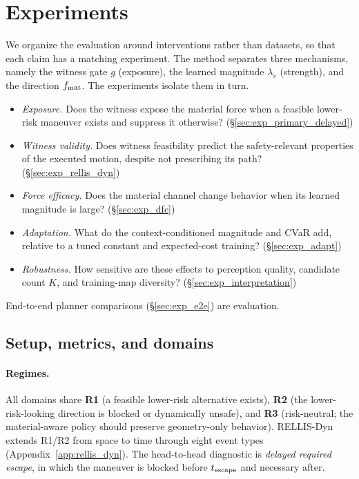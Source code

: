 \section{Experiments}
\label{sec:experiments}

\providecommand{\Kdef}{16}
\providecommand{\needsnum}[1]{\textcolor{red}{\textbf{[NEED: #1]}}}

We organize the evaluation around interventions rather than datasets, so that each claim has a matching experiment. The method separates three mechanisms, namely the witness gate $g$ (exposure), the learned magnitude $\lambda_s$ (strength), and the direction $f_{\rm mat}$. The experiments isolate them in turn.
\begin{itemize}\itemsep2pt
  \item[\textbf{RQ1}] \emph{Exposure.} Does the witness expose the material force when a feasible lower-risk maneuver exists and suppress it otherwise? (\S\ref{sec:exp_primary_delayed})
  \item[\textbf{RQ2}] \emph{Witness validity.} Does witness feasibility predict the safety-relevant properties of the executed motion, despite not prescribing its path? (\S\ref{sec:exp_rellis_dyn})
  \item[\textbf{RQ3}] \emph{Force efficacy.} Does the material channel change behavior when its learned magnitude is large? (\S\ref{sec:exp_dfc})
  \item[\textbf{RQ4}] \emph{Adaptation.} What do the context-conditioned magnitude and CVaR add, relative to a tuned constant and expected-cost training? (\S\ref{sec:exp_adapt})
  \item[\textbf{RQ5}] \emph{Robustness.} How sensitive are these effects to perception quality, candidate count $K$, and training-map diversity? (\S\ref{sec:exp_interpretation})
\end{itemize}
End-to-end planner comparisons (\S\ref{sec:exp_e2e}) are evaluation.
 
\subsection{Setup, metrics, and domains}
\label{sec:exp_setup}

\paragraph{Regimes.} All domains share \textbf{R1} (a feasible lower-risk alternative exists), \textbf{R2} (the lower-risk-looking direction is blocked or dynamically unsafe), and \textbf{R3} (risk-neutral; the material-aware policy should preserve geometry-only behavior). RELLIS-Dyn extends R1/R2 from space to time through eight event types (Appendix~\ref{app:rellis_dyn}). The head-to-head diagnostic is \emph{delayed required escape}, in which the maneuver is blocked before $t_{\rm escape}$ and necessary after.

